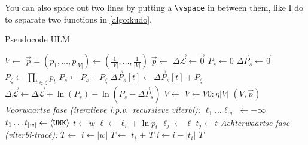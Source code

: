 You can also space out two lines by putting a \verb|\vspace| in between them, like I do to separate two functions in \autoref{algo:kudo}.
\begin{algorithm}[H]
	\caption{Pseudocode ULM}
	\label{algo:kudo}
	\begin{algorithmic}[1]
			\State $V \gets $ 
			\State $\vec p = (p_1,\hdots,p_{|V|}) \gets (\tfrac{1}{|V|},\hdots,\tfrac{1}{|V|})$
				\State $\vec p \gets$ 
				\State $\Delta\vec{\mathcal L} \gets \vec 0$
					\State $P_s \gets 0$
					\State $\Delta\vec{P}_s \gets \vec 0$  
						\State $P_\zeta \gets \displaystyle\prod_{t\in \zeta} p_t$\label{line:ulm}  
						\State $P_s \gets P_s + P_\zeta$
							\State $\Delta\vec{P}_s[t] \gets \Delta\vec{P}_s[t] + P_\zeta$  
						\EndFor
					\EndFor 
					\Stateh $\Delta\vec{\mathcal L} \gets \Delta\vec{\mathcal L} + \ln(P_s) - \ln(P_s - \Delta\vec P_s)$  
				\EndFor
				\Statey $V\gets$   
				\State $V \gets V$\co{[}$0:\eta|V|$\co{]}  
			\EndWhile
			\Statey \Return $(V,\vec p)$
		\EndFunction
		\vspace{1em}
			\State \textsl{Voorwaartse fase (iteratieve i.p.v.\ recursieve viterbi):}
			\State $\ell_1 \hdots \ell_{|w|} \gets -\infty$  
			\State $t_1 \hdots t_{|w|} \gets \langle \texttt{UNK}\rangle$  
					\State $t\gets w$ 
						\State $\ell \gets\ell_i + \ln p_t$
							\State $\ell_j \gets \ell$
							\State $t_j \gets t$
						\EndIf 
					\EndIf 
				\EndFor 
			\EndFor 
			\Stateh \textsl{Achterwaartse fase (viterbi-tracé):}
			\State $T\gets$ \co{[]}
			\State $i\gets |w|$
				\State $T \gets$ \co{[}$t_i$\co{]} + $T$
				\State $i \gets i - |t_i|$
			\EndWhile
			\Statey \Return $T$
		\EndFunction
	\end{algorithmic}
\end{algorithm}

